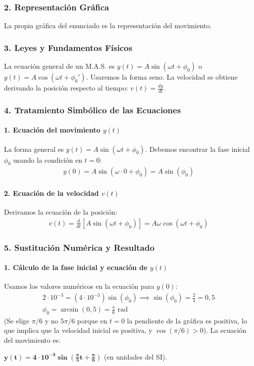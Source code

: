 \subsubsection*{2. Representación Gráfica}
La propia gráfica del enunciado es la representación del movimiento.

\subsubsection*{3. Leyes y Fundamentos Físicos}
La ecuación general de un M.A.S. es $y(t) = A \sin(\omega t + \phi_0)$ o $y(t) = A \cos(\omega t + \phi_0')$. Usaremos la forma seno. La velocidad se obtiene derivando la posición respecto al tiempo: $v(t) = \frac{dy}{dt}$.

\subsubsection*{4. Tratamiento Simbólico de las Ecuaciones}
\paragraph*{1. Ecuación del movimiento $y(t)$}
La forma general es $y(t) = A \sin(\omega t + \phi_0)$. Debemos encontrar la fase inicial $\phi_0$ usando la condición en $t=0$:
\begin{gather}
    y(0) = A \sin(\omega \cdot 0 + \phi_0) = A \sin(\phi_0)
\end{gather}
\paragraph*{2. Ecuación de la velocidad $v(t)$}
Derivamos la ecuación de la posición:
\begin{gather}
    v(t) = \frac{d}{dt} [A \sin(\omega t + \phi_0)] = A\omega \cos(\omega t + \phi_0)
\end{gather}

\subsubsection*{5. Sustitución Numérica y Resultado}
\paragraph*{1. Cálculo de la fase inicial y ecuación de $y(t)$}
Usamos los valores numéricos en la ecuación para $y(0)$:
\begin{gather}
    2 \cdot 10^{-3} = (4 \cdot 10^{-3}) \sin(\phi_0) \implies \sin(\phi_0) = \frac{2}{4} = 0,5 \nonumber \\[8pt]
    \phi_0 = \arcsin(0,5) = \frac{\pi}{6} \text{ rad}
\end{gather}
(Se elige $\pi/6$ y no $5\pi/6$ porque en $t=0$ la pendiente de la gráfica es positiva, lo que implica que la velocidad inicial es positiva, y $\cos(\pi/6)>0$).
La ecuación del movimiento es:
\begin{cajaresultado}
    $\boldsymbol{y(t) = 4 \cdot 10^{-3} \sin\left(\frac{\pi}{5}t + \frac{\pi}{6}\right)}$ (en unidades del SI).
\end{cajaresultado}


